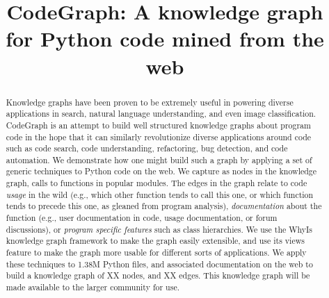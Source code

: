 \documentclass[sigconf]{acmart}
\begin{document}
\title{CodeGraph: A knowledge graph for Python code mined from the web}






\begin{abstract}
Knowledge graphs have been proven to be extremely useful in powering diverse applications in search, natural language understanding, and even image classification.  CodeGraph is an attempt to build well structured knowledge graphs about program code in the hope that it can similarly revolutionize diverse applications around code such as code search, code understanding, refactoring, bug detection, and code automation.  We demonstrate how one might build such a graph by applying a set of generic techniques to Python code on the web.  We capture as nodes in the knowledge graph, calls to functions in popular modules.  The edges in the graph relate to code \textit{usage} in the wild (e.g., which other function tends to call this one, or which function tends to precede this one, as gleaned from program analysis), \textit{documentation} about the function (e.g., user documentation in code, usage documentation, or forum discussions), or \textit{program specific features} such as class hierarchies.  We use the WhyIs knowledge graph framework to make the graph easily extensible, and use its views feature to make the graph more usable for different sorts of applications.  We apply these techniques to 1.38M Python files, and associated documentation on the web to build a knowledge graph of XX nodes, and XX edges.  This knowledge graph will be made available to the larger community for use. 
\end{abstract}
\end{document}
